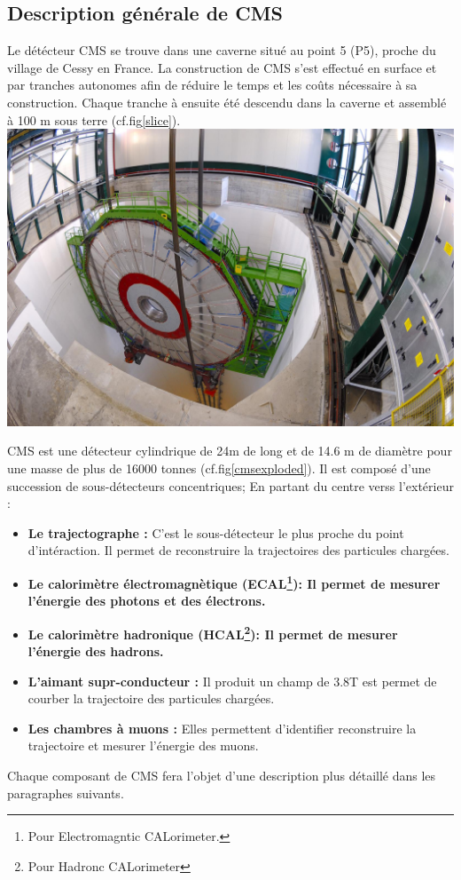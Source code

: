 \subsection{Description générale de CMS}
Le détécteur CMS se trouve dans une caverne situé au point 5 (P5), proche du village de Cessy en France. La construction de CMS s'est effectué en surface et par tranches autonomes afin de réduire le temps et les coûts nécessaire à sa construction. Chaque tranche à ensuite été descendu dans la caverne et assemblé à 100 m sous terre (cf.fig\ref{slice}).
\marginpar
{
	\includegraphics[width=\marginparwidth]{CMS/slice.jpg}
	\label{slice}
}

CMS est une détecteur cylindrique de 24m de long et de 14.6 m de diamètre pour une masse de plus de 16000 tonnes (cf.fig\ref{cmsexploded}). Il est composé d'une succession de sous-détecteurs concentriques; En partant du centre verss l'extérieur :
\begin{itemize}[label=$\bullet$]
	\item \textbf{Le trajectographe : } C'est le sous-détecteur le plus proche du point d'intéraction. Il permet de reconstruire la trajectoires des particules chargées.
	 \item \textbf{Le calorimètre électromagnètique (ECAL\footnote{Pour Electromagntic CALorimeter.}): Il permet de mesurer l'énergie des photons et des électrons.}
	 \item \textbf{Le calorimètre hadronique (HCAL\footnote{Pour Hadronc CALorimeter}): Il permet de mesurer l'énergie des hadrons.}
	 \item \textbf{L'aimant supr-conducteur : } Il produit un champ de 3.8T est permet de courber la trajectoire des particules chargées.
	 \item \textbf{Les chambres à muons : } Elles permettent d'identifier reconstruire la trajectoire et mesurer l'énergie des muons. 
\end{itemize}
Chaque composant de CMS fera l'objet d'une description plus détaillé dans les paragraphes suivants.


